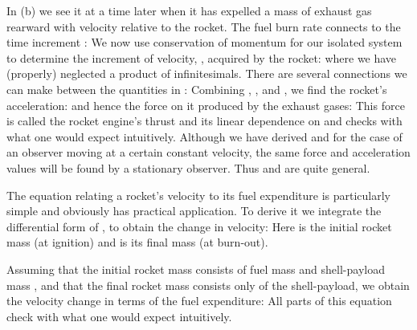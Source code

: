 {In (b) we see it at a time  later when it has expelled a mass of
exhaust gas  rearward with velocity  relative to the rocket.
The fuel burn rate  connects  to the time increment :
%
%
\noindent We now use conservation of momentum for our isolated system to determine the
increment of velocity, , acquired by the rocket:
%
%
%
where we have (properly) neglected a product of infinitesimals.
There are several connections we can make between the quantities in
:
%
%
%
%
Combining , , and , we find the
rocket's acceleration:
%
%
\noindent and hence the force on it produced by the exhaust gases:
%
%
This force is called the rocket engine's thrust and its linear dependence on
 and  checks with what one would expect intuitively.
Although we have derived  and  for
the case of an observer moving at a certain constant velocity, the same force
and acceleration values will be found by a stationary observer.
%
%
Thus  and  are quite general.

The equation relating a rocket's velocity to its fuel expenditure is
particularly simple and obviously has practical application.
To derive it we integrate the differential form of ,
%
%
to obtain the change in velocity:
%
%
Here  is the initial rocket mass (at ignition) and 
is its final mass (at burn-out).

Assuming that the initial rocket mass consists of fuel mass  and
shell-payload mass , and that the final rocket mass consists only of the
shell-payload, we obtain the velocity change in terms of the fuel expenditure:
%
%
All parts of this equation check with what one would expect intuitively.

}

